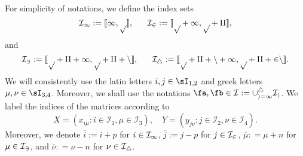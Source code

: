 \cob
\begin{definition}\label{def_index}
For simplicity of notations, we define the index sets
$$\cal I_1:=\llbracket 1,p\rrbracket, \ \quad \ \cal I_2:=\llbracket p+1,p+q\rrbracket,$$
and 
$$\cal I_3:=\llbracket p+q+1,p+q+n\rrbracket, \ \quad \ \cal I_4:=\llbracket p+q+n+1,p+q+2n\rrbracket. $$
 We will consistently use the latin letters $i,j\in\sI_{1,2}$ and greek letters $\mu,\nu\in\sI_{3,4}$. Moreover, we shall use the notations $\fa,\fb\in \cal I:=\cup_{i=1}^4 \cal I_i$. We label the indices of the matrices according to
 $$X= (x_{i\mu}:i\in \mathcal I_1, \mu \in \mathcal I_3), \quad Y= (y_{j\nu}:j\in \mathcal I_2, \nu \in \mathcal I_4).$$
Moreover, we denote $\overline i:= i+p$ for $i\in \cal I_1$, $\overline j:= j-p$ for $j\in \cal I_2$, $\overline \mu : = \mu +n $ for $\mu \in \cal I_3$, and $\overline \nu : = \nu - n $ for $\nu \in \cal I_4$. 
\end{definition}



